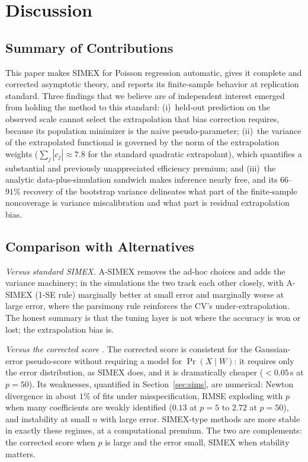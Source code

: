 \section{Discussion}\label{sec:discussion}

\subsection{Summary of Contributions}

This paper makes SIMEX for Poisson regression automatic, gives it
complete and corrected asymptotic theory, and reports its
finite-sample behavior at replication standard. Three findings that we
believe are of independent interest emerged from holding the method to
this standard: (i)~held-out prediction on the observed scale cannot
select the extrapolation that bias correction requires, because its
population minimizer is the naive pseudo-parameter; (ii)~the variance
of the extrapolated functional is governed by the norm of the
extrapolation weights ($\sum_j|c_j|\approx7.8$ for the standard
quadratic extrapolant), which quantifies a substantial and previously
unappreciated efficiency premium; and (iii)~the analytic
data-plus-simulation sandwich makes inference nearly free, and its
$66$--$91\%$ recovery of the bootstrap variance delineates what part
of the finite-sample noncoverage is variance miscalibration and what
part is residual extrapolation bias.

\subsection{Comparison with Alternatives}

\emph{Versus standard SIMEX.} A-SIMEX removes the ad-hoc choices and
adds the variance machinery; in the simulations the two track each
other closely, with A-SIMEX (1-SE rule) marginally better at small
error and marginally worse at large error, where the parsimony rule
reinforces the CV's under-extrapolation. The honest summary is that
the tuning layer is not where the accuracy is won or lost; the
extrapolation bias is.

\emph{Versus the corrected score \citep{nakamura1990}.} The corrected
score is consistent for the Gaussian-error pseudo-score without
requiring a model for $\Pr(X\mid W)$: it requires only the error
distribution, as SIMEX does, and it is dramatically cheaper
($<0.05$\,s at $p=50$). Its weaknesses, quantified in
Section~\ref{sec:sims}, are numerical: Newton divergence in about
$1\%$ of fits under misspecification, RMSE exploding with $p$ when
many coefficients are weakly identified ($0.13$ at $p=5$ to $2.72$ at
$p=50$), and instability at small $n$ with large error. SIMEX-type
methods are more stable in exactly these regimes, at a computational
premium. The two are complements: the corrected score when $p$ is
large and the error small, SIMEX when stability matters.

